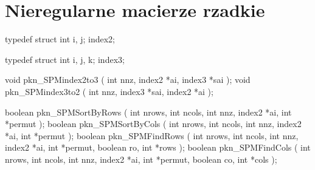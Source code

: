 \vspace{\bigskipamount}

\vspace{\bigskipamount}

\vspace{\bigskipamount}


\newpage
\section{\label{sect:sparse:matrices}Nieregularne macierze rzadkie}

\begin{listingC}
typedef struct {
    int i, j;
  } index2;

typedef struct {
    int i, j, k;
  } index3;
\end{listingC}

\begin{listingC}
void pkn_SPMindex2to3 ( int nnz, index2 *ai, index3 *sai );
void pkn_SPMindex3to2 ( int nnz, index3 *sai, index2 *ai );

boolean pkn_SPMSortByRows ( int nrows, int ncols, int nnz,
                            index2 *ai, int *permut );
boolean pkn_SPMSortByCols ( int nrows, int ncols, int nnz,
                            index2 *ai, int *permut );  
boolean pkn_SPMFindRows ( int nrows, int ncols, int nnz,
                          index2 *ai, int *permut, boolean ro,
                          int *rows );
boolean pkn_SPMFindCols ( int nrows, int ncols, int nnz,
                          index2 *ai, int *permut, boolean co,
                          int *cols );
\end{listingC}

